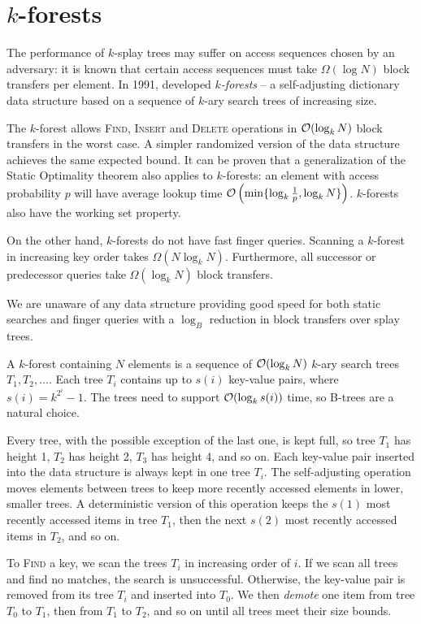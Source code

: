 \chapter{$k$-forests}
\label{chapter:kforest}
The performance of $k$-splay trees may suffer on access sequences chosen
by an adversary: it is known that certain access sequences must
take $\Omega(\log N)$ block transfers per element.
In 1991, \cite{martel} developed \emph{$k$-forests} --
a self-adjusting dictionary data structure based on a sequence of
$k$-ary search trees of increasing size.

The $k$-forest allows \textsc{Find}, \textsc{Insert} and \textsc{Delete}
operations in $\mathcal{O}(\log_k N)$ block transfers in the worst case. A simpler
randomized version of the data structure achieves the same expected bound.
It can be proven that a generalization of the Static Optimality theorem
also applies to $k$-forests: an element with access probability $p$
will have average lookup time $\mathcal{O}\left(\min\{\log_k \frac{1}{p}, \log_k
N\}\right)$. $k$-forests also have the working set property.

On the other hand, $k$-forests do not have fast finger queries. Scanning
a $k$-forest in increasing key order takes $\Omega(N\log_k N)$. Furthermore,
all successor or predecessor queries take $\Omega(\log_k N)$ block transfers.

We are unaware of any data structure providing good speed for both static
searches and finger queries with a $\log_B$ reduction in block transfers
over splay trees.

A $k$-forest containing $N$ elements is a sequence of $\mathcal{O}(\log_k N)$ $k$-ary
search trees $T_1, T_2, \ldots$. Each tree $T_i$ contains up to $s(i)$ key-value
pairs, where $s(i) = k^{2^i} - 1$. The trees need to support $\mathcal{O}(\log_k s(i))$
time, so B-trees are a natural choice.

Every tree, with the possible exception of the last one, is kept full,
so tree $T_1$ has height 1, $T_2$ has height 2, $T_3$ has height 4, and so on.
Each key-value pair inserted into the data structure is always kept in one
tree $T_i$. The self-adjusting operation moves elements between trees to
keep more recently accessed elements in lower, smaller trees.
A deterministic version of this operation keeps the $s(1)$ most recently
accessed items in tree $T_1$, then the next $s(2)$ most recently accessed
items in $T_2$, and so on.

To \textsc{Find} a key, we scan the trees $T_i$ in increasing order of $i$.
If we scan all trees and find no matches, the search is unsuccessful.
Otherwise, the key-value pair is removed from its tree $T_i$ and inserted
into $T_0$. We then \emph{demote} one item from tree $T_0$ to $T_1$,
then from $T_1$ to $T_2$, and so on until all trees meet their size bounds.

